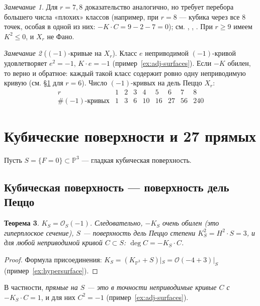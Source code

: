 \documentclass[11pt,a4paper]{article}
\theoremstyle{plain}
\newtheorem{theorem}{Теорема}[section]
\theoremstyle{definition}
\theoremstyle{remark}
\newtheorem{remark}[theorem]{Замечание}
\newcommand{\PP}{\mathbb{P}}
\newcommand{\cO}{\mathcal{O}}
\begin{document}
\begin{remark}
Для $r=7,8$ доказательство аналогично, но требует перебора большего числа «плохих» классов (например, при $r=8$
--- кубика через все 8 точек, особая в одной из них: $-K\cdot C=9-2-7=0$); см. \cite[Теорема~24.4]{Ma}, \cite{De}, \cite[8.1]{Do}. При $r\ge9$
имеем $K^2\le0$, и $X_r$ не Фано.
\end{remark}

\begin{remark}[$(-1)$-кривые на $X_r$]
Класс $e$ неприводимой $(-1)$-кривой удовлетворяет $e^2=-1$, $K\cdot e=-1$ (пример~\ref{ex:adj-surfaces}).
Если $-K$ обилен, то верно и обратное: каждый такой класс содержит ровно одну неприводимую кривую (см.
\S\ref{sec:cubic} для $r=6$). Число $(-1)$-кривых на дель Пеццо $X_r$:
\[
\begin{array}{c|cccccccc}
r & 1&2&3&4&5&6&7&8\\\hline
\#(-1)\text{-кривых} & 1&3&6&10&16&27&56&240
\end{array}
\]
\end{remark}

\section{Кубические поверхности и 27 прямых}\label{sec:cubic}

Пусть $S=\{F=0\}\subset\PP^3$ --- гладкая кубическая поверхность.

\subsection{Кубическая поверхность --- поверхность дель Пеццо}

\begin{theorem}
$K_S=\cO_S(-1)$. Следовательно, $-K_S$ очень обилен (это гиперплоское сечение), $S$ --- поверхность дель Пеццо
степени $K_S^2=H^2\cdot S=3$, и для любой неприводимой кривой $C\subset S$: $\deg C=-K_S\cdot C$.
\end{theorem}
\begin{proof}
Формула присоединения: $K_S=(K_{\PP^3}+S)|_S=\cO(-4+3)|_S$ (пример~\ref{ex:hypersurface}).
\end{proof}

В частности, \emph{прямые на $S$ --- это в точности неприводимые кривые $C$ с $-K_S\cdot C=1$}, и для них
$C^2=-1$ (пример~\ref{ex:adj-surfaces}).
\end{document}
